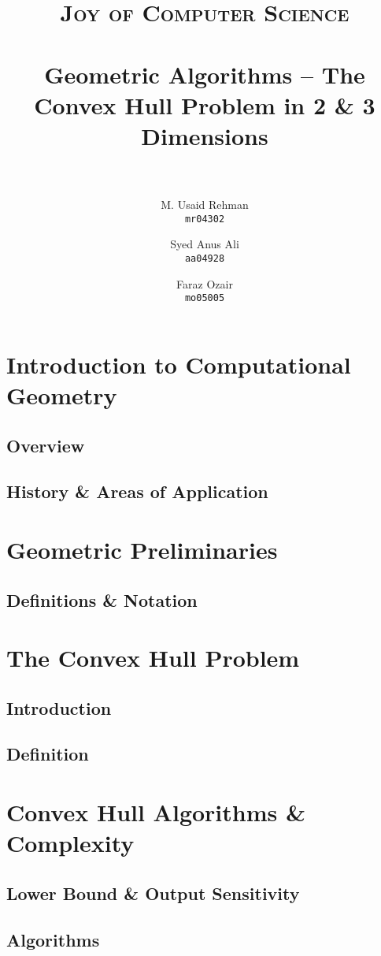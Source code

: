 \documentclass[paper=a4, fontsize=11pt]{scrartcl}
\title{
		\usefont{OT1}{bch}{b}{n}
		\normalfont \normalsize \textsc{Joy of Computer Science} \\ [25pt]
		\horrule{0.5pt} \\[0.4cm]
		\huge Geometric Algorithms -- The Convex Hull Problem in 2 \& 3 Dimensions \\
		\horrule{2pt} \\[0.5cm]
}
\author{
		\normalfont 								\normalsize
        M. Usaid Rehman\\[-3pt]		\normalsize
        \texttt{mr04302}
        \and 
        \normalfont 								\normalsize
        Syed Anus Ali\\[-3pt]		\normalsize
        \texttt{aa04928}
        \and 
        \normalfont 								\normalsize
        Faraz Ozair\\[-3pt]		\normalsize
        \texttt{mo05005}
}
\date{}
\numberwithin{equation}{section}		%
\numberwithin{figure}{section}			%
\numberwithin{table}{section}				%
\begin{document}
\maketitle

\section{Introduction to Computational Geometry}
\subsection{Overview}
\subsection{History & Areas of Application}

\section{Geometric Preliminaries}
\subsection{Definitions & Notation}

\section{The Convex Hull Problem}
\subsection{Introduction}

\subsection{Definition}

\section{Convex Hull Algorithms & Complexity}
\subsection{Lower Bound & Output Sensitivity}



\subsection{Algorithms}


\end{document}
